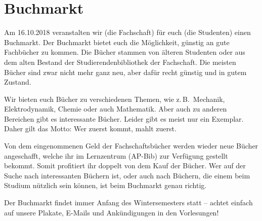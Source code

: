 \vspace{-6ex}
\section{Buchmarkt}
\vspace{-3ex}
\begin{multicols*}{2}
\begin{figure}
\end{figure}
Am 16.10.2018 veranstalten wir (die Fachschaft) für euch (die Studenten) einen Buchmarkt.
Der Buchmarkt bietet euch die Möglichkeit, günstig an gute Fachbücher zu kommen.
Die Bücher stammen von älteren Studenten oder aus dem alten Bestand der Studierendenbibliothek der Fachschaft.
Die meisten Bücher sind zwar nicht mehr ganz neu, aber dafür recht günstig und in gutem Zustand.

Wir bieten euch Bücher zu verschiedenen Themen, wie z.\,B.\ Mechanik, Elektrodynamik, Chemie oder auch Mathematik.
Aber auch zu anderen Bereichen gibt es interessante Bücher.
Leider gibt es meist nur ein Exemplar.
Daher gilt das Motto: Wer zuerst kommt, mahlt zuerst.

Von dem eingenommenen Geld der Fachschaftsbücher werden wieder neue Bücher angeschafft, welche ihr im Lernzentrum (AP-Bib) zur Verfügung gestellt bekommt.
Somit profitiert ihr doppelt von dem Kauf der Bücher.
Wer auf der Suche nach interessanten Büchern ist, oder auch nach Büchern, die einem beim Studium nützlich sein können, ist beim Buchmarkt genau richtig.

Der Buchmarkt findet immer Anfang des Wintersemesters statt -- achtet einfach auf unsere Plakate, E-Mails und Ankündigungen in den Vorlesungen!

\end{multicols*}

